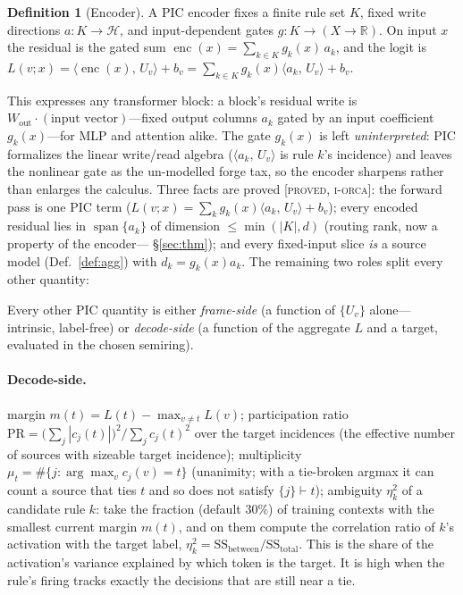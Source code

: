 \documentclass[11pt]{article}
\theoremstyle{definition}
\newtheorem{definition}{Definition}[section]
\theoremstyle{plain}
\theoremstyle{remark}
\newcommand{\proved}{\textsc{[proved, i-orca]}}
\newcommand{\HH}{\mathcal{H}}
\newcommand{\RR}{\mathbb{R}}
\newcommand{\inner}[2]{\langle #1,\, #2\rangle}
\begin{document}
\begin{definition}[Encoder]\label{def:enc}
A PIC encoder fixes a finite rule set $K$, fixed write directions $a:K\to\HH$, and input-dependent gates
$g:K\to(X\to\RR)$. On input $x$ the residual is the gated sum $\operatorname{enc}(x)=\sum_{k\in K}g_k(x)\,a_k$,
and the logit is $L(v;x)=\inner{\operatorname{enc}(x)}{U_v}+b_v=\sum_{k\in K}g_k(x)\inner{a_k}{U_v}+b_v$.
\end{definition}

This expresses any transformer block: a block's residual write is $W_{\mathrm{out}}\cdot(\text{input
vector})$---fixed output columns $a_k$ gated by an input coefficient $g_k(x)$---for MLP and attention
alike. The gate $g_k(x)$ is left \emph{uninterpreted}: PIC formalizes the linear write/read algebra
($\inner{a_k}{U_v}$ is rule $k$'s incidence) and leaves the nonlinear gate as the un-modelled forge tax,
so the encoder sharpens rather than enlarges the calculus. Three facts are proved \proved{}: the forward
pass is one PIC term ($L(v;x)=\sum_k g_k(x)\inner{a_k}{U_v}+b_v$); every encoded residual lies in
$\operatorname{span}\{a_k\}$ of dimension $\le\min(|K|,d)$ (routing rank, now a property of the encoder---
\S\ref{sec:thm}); and every fixed-input slice \emph{is} a source model (Def.~\ref{def:agg}) with
$d_k=g_k(x)a_k$. The remaining two roles split every other quantity:

Every other PIC quantity is either \emph{frame-side} (a function of $\{U_v\}$ alone---intrinsic,
label-free) or \emph{decode-side} (a function of the aggregate $L$ and a target, evaluated in the chosen
semiring).

\paragraph{Decode-side.}
margin $m(t)=L(t)-\max_{v\neq t}L(v)$;\quad
participation ratio $\mathrm{PR}=\bigl(\sum_j|c_j(t)|\bigr)^2/\sum_j c_j(t)^2$ over the target incidences
(the effective number of sources with sizeable target incidence);\quad
multiplicity $\mu_t=\#\{j:\arg\max_v c_j(v)=t\}$ (unanimity; with a tie-broken argmax it can count a
source that ties $t$ and so does not satisfy $\{j\}\vdash t$);\quad
ambiguity $\eta^2_k$ of a candidate rule $k$: take the fraction (default $30\%$) of training contexts with
the smallest current margin $m(t)$, and on them compute the correlation ratio of $k$'s activation with
the target label, $\eta^2_k=\mathrm{SS}_{\mathrm{between}}/\mathrm{SS}_{\mathrm{total}}$. This is the share
of the activation's variance explained by which token is the target. It is high when the rule's firing
tracks exactly the decisions that are still near a tie.
\end{document}
